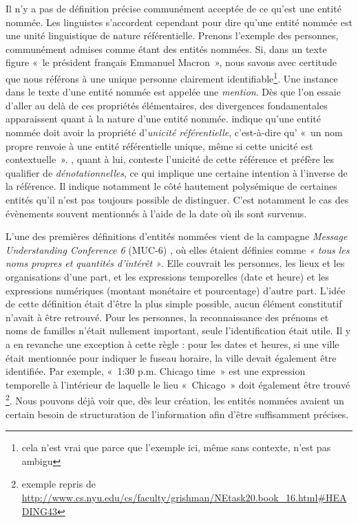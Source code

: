 \documentclass[12pt,a4paper,times,twoside,openright]{report}
\begin{document}
Il n'y a pas de définition précise communément acceptée de ce qu'est une entité nommée. Les linguistes s'accordent cependant pour dire qu'une entité nommée est une unité linguistique de nature référentielle. Prenons l'exemple des personnes, communément admises comme étant des entités nommées. Si, dans un texte figure «\ le président français Emmanuel Macron\ », nous savons avec certitude que nous référons à une unique personne clairement identifiable\footnote{cela n'est vrai que parce que l'exemple ici, même sans contexte, n'est pas ambigu}. Une instance dans le texte d'une entité nommée est appelée une \emph{mention}. Dès que l'on essaie d'aller au delà de ces propriétés élémentaires, des divergences fondamentales apparaissent quant à la nature d'une entité nommée. \citet{fort2009towards} indique qu'une entité nommée doit avoir la propriété d'\emph{unicité référentielle}, c'est-à-dire qu' «\ un nom propre renvoie à une entité référentielle unique, même si cette unicité est contextuelle\ ». \citet{poibeau2005statut}, quant à lui, conteste l'unicité de cette référence et préfère les qualifier de \emph{dénotationnelles}, ce qui implique une certaine intention à l'inverse de la référence. Il indique notamment le côté hautement polysémique de certaines entités qu'il n'est pas toujours possible de distinguer. C'est notamment le cas des évènements souvent mentionnés à l'aide de la date où ils sont survenus.

L'une des premières définitions d'entités nommées vient de la campagne \textit{Message Understanding Conference 6} (MUC-6) \citep{grishman1996message}, où elles étaient définies comme \emph{« tous les noms propres et quantités d'intérêt »}. Elle couvrait les personnes, les lieux et les organisations d'une part, et les expressions temporelles (date et heure) et les expressions numériques (montant monétaire et pourcentage) d'autre part. L'idée de cette définition était d'être la plus simple possible, aucun élément constitutif n'avait à être retrouvé. Pour les personnes, la reconnaissance des prénoms et noms de familles n'était nullement important, seule l'identification était utile. Il y a en revanche une exception à cette règle : pour les dates et heures, si une ville était mentionnée pour indiquer le fuseau horaire, la ville devait également être identifiée. Par exemple, «\ 1:30 p.m. Chicago time\ » est une expression temporelle à l'intérieur de laquelle le lieu «\ Chicago\ » doit également être trouvé \footnote{exemple repris de \url{http://www.cs.nyu.edu/cs/faculty/grishman/NEtask20.book_16.html\#HEADING43}}. Nous pouvons déjà voir que, dès leur création, les entités nommées avaient un certain besoin de structuration de l'information afin d'être suffisamment précises.
\end{document}
